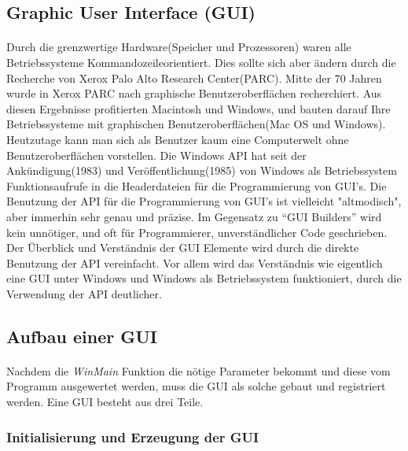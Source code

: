 \subsection{Graphic User Interface (GUI)}
\paragraph{}
Durch die grenzwertige Hardware(Speicher und Prozessoren) waren alle Betriebssysteme Kommandozeileorientiert. Dies sollte sich aber ändern durch die Recherche von Xerox Palo Alto Research Center(PARC). Mitte der 70 Jahren wurde in Xerox PARC nach graphische Benutzeroberflächen recherchiert. Aus diesen Ergebnisse profitierten Macintosh und Windows, und bauten darauf Ihre Betriebssysteme mit graphischen Benutzeroberflächen(Mac OS und Windows). Heutzutage kann man sich als Benutzer kaum eine Computerwelt ohne Benutzeroberflächen vorstellen. Die Windows API hat seit der Ankündigung(1983) und Veröffentlichung(1985) von Windows als Betriebssystem Funktionsaufrufe in die Headerdateien für die Programmierung von GUI's. Die Benutzung der API für die Programmierung von GUI's ist vielleicht "altmodisch", aber immerhin sehr genau und präzise. Im Gegensatz zu "`GUI Builders"' wird kein unnötiger, und oft für Programmierer, unverständlicher Code geschrieben. Der Überblick und Verständnis der GUI Elemente wird durch die direkte Benutzung der API vereinfacht. Vor allem wird das Verständnis wie eigentlich eine GUI unter Windows und Windows als Betriebssystem funktioniert, durch die Verwendung der API deutlicher.

\subsection{Aufbau einer GUI}
\paragraph{}
Nachdem die \textit{WinMain} Funktion die nötige Parameter bekommt und diese vom Programm ausgewertet werden, muss die GUI als solche gebaut und registriert werden. Eine GUI besteht aus drei Teile.


\subsubsection{Initialisierung und Erzeugung der GUI}
